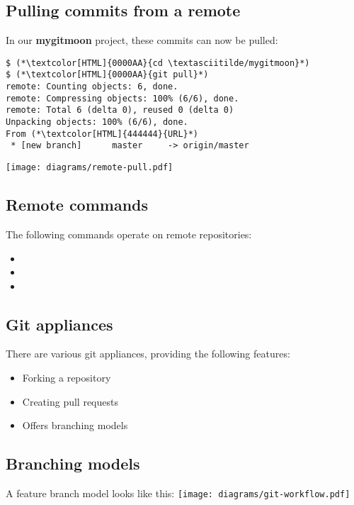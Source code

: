 \subsection{Pulling commits from a remote}
\begin{frame}[fragile]
  \subslidetitle
  In our \textbf{mygitmoon} project, these commits can now be pulled:
  \begin{lstlisting}
$ (*\textcolor[HTML]{0000AA}{cd \textasciitilde/mygitmoon}*)
$ (*\textcolor[HTML]{0000AA}{git pull}*)
remote: Counting objects: 6, done.
remote: Compressing objects: 100% (6/6), done.
remote: Total 6 (delta 0), reused 0 (delta 0)
Unpacking objects: 100% (6/6), done.
From (*\textcolor[HTML]{444444}{URL}*)
 * [new branch]      master     -> origin/master
\end{lstlisting}
\center \texttt{[image: diagrams/remote-pull.pdf]}
\end{frame}

\subsection{Remote commands}
\begin{frame}[fragile]
  \subslidetitle
  The following commands operate on remote repositories:
  \begin{itemize}
    \item {}
    \item {}
    \item {}
  \end{itemize}
\end{frame}

\subsection{Git appliances}
\begin{frame}[fragile]
  \subslidetitle
  There are various git appliances, providing the following features:
  \begin{itemize}
    \item Forking a repository
    \item Creating pull requests
    \item Offers branching models
  \end{itemize}
\end{frame}

\subsection{Branching models}
\begin{frame}[fragile]
  \subslidetitle
  A feature branch model looks like this:
  \center \texttt{[image: diagrams/git-workflow.pdf]}
\end{frame}
